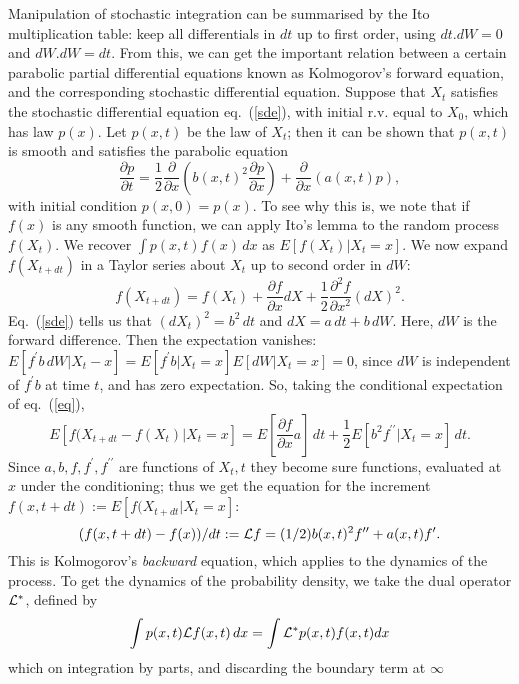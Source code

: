 Manipulation of stochastic integration can be summarised
by the Ito multiplication table: keep all differentials in $dt$
up to first order, using $dt.dW=0$ and $dW.dW=dt$. From this, we can get
the important relation between a certain parabolic partial differential
equations known as Kolmogorov's forward equation, and the corresponding 
stochastic differential equation. Suppose that
$X_t$ satisfies the stochastic differential equation eq.~(\ref{sde}),
with initial r.v. equal to $X_0$, which has law $p(x)$.
Let $p(x,t)$ be the law of $X_t$; then it can be shown that
$p(x,t)$ is smooth and satisfies the parabolic equation
\begin{equation}
\frac{\partial p}{\partial t}=\frac{1}{2}\frac{\partial}{\partial x}\left
(b(x,t)^2\frac{\partial p}{\partial x}\right)+\frac{\partial}{\partial x}
(a(x,t)p),
\label{63}
\end{equation}
with initial condition $p(x,0)=p(x)$.
To see why this is, we note that if $f(x)$ is any smooth function,
we can apply Ito's lemma to the random process $f(X_t)$. We
recover $\int p(x,t)f(x)\,dx$ as $E[f(X_t)|X_t=x]$.
We now expand $f(X_{t+dt})$ in a Taylor series about $X_t$ up to
second order in $dW$:
\begin{equation}
f(X_{t+dt})=f(X_t)+\frac{\partial f}{\partial x}dX+\frac{1}{2}
\frac{\partial^2f}{\partial x^2}(dX)^2.
\label{eq}
\end{equation}
Eq.~(\ref{sde}) tells us that $(dX_t)^2=b^2\,dt$ and $dX=a\,dt +b\,dW$.
Here, $dW$ is the forward difference. Then
the expectation  vanishes: $E[f^\prime b\,dW|X_t-x]=E[f^\prime b|X_t=x]
E[dW|X_t=x]=0$,
since $dW$ is independent of $f^\prime b$ at time $t$,
and has zero expectation. So, taking the conditional
expectation of eq.~(\ref{eq}),
\begin{equation}
E[f(X_{t+dt}-f(X_t)|X_t=x]=E[\frac{\partial f}{\partial x}a]\,dt+
\frac{1}{2}E[b^2f^{\prime\prime}|X_t=x]\,dt.
\end{equation}
Since $a,b,f,f^\prime,f^{\prime\prime}$ are functions of $X_t,t$
they become sure functions, evaluated at $x$
under the conditioning; thus we get the equation for the increment
$f(x,t+dt):=E[f(X_{t+dt}|X_t=x]$:
\[(f(x,t+dt)-f(x))/dt:={\cal L}f=
(1/2)b(x,t)^2f^{\prime\prime}+a(x,t)f^\prime.\]
This is Kolmogorov's {\em backward} equation, which applies to the
dynamics of the process. To get the dynamics of the probability density,
we take the dual operator ${\cal L}^*$, defined by 
\[ \int p(x,t){\cal L}f(x,t)\,dx=\int{\cal L}^*p(x,t)f(x,t)dx\]
which on integration by parts, and discarding the boundary term at $\infty$
